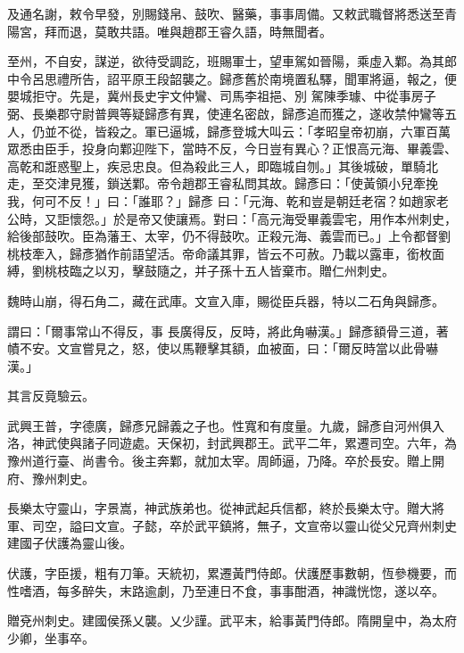 \begin{pinyinscope}
 及通名謝，敕令早發，別賜錢帛、鼓吹、醫藥，事事周備。又敕武職督將悉送至青陽宮，拜而退，莫敢共語。唯與趙郡王睿久語，時無聞者。



 至州，不自安，謀逆，欲待受調訖，班賜軍士，望車駕如晉陽，乘虛入鄴。為其郎中令呂思禮所告，詔平原王段韶襲之。歸彥舊於南境置私驛，聞軍將逼，報之，便嬰城拒守。先是，冀州長史宇文仲鸞、司馬李祖挹、別
 駕陳季璩、中從事房子弼、長樂郡守尉普興等疑歸彥有異，使連名密啟，歸彥追而獲之，遂收禁仲鸞等五人，仍並不從，皆殺之。軍已逼城，歸彥登城大叫云：「孝昭皇帝初崩，六軍百萬眾悉由臣手，投身向鄴迎陛下，當時不反，今日豈有異心？正恨高元海、畢義雲、高乾和誑惑聖上，疾忌忠良。但為殺此三人，即臨城自刎。」其後城破，單騎北走，至交津見獲，鎖送鄴。帝令趙郡王睿私問其故。歸彥曰：「使黃領小兒牽挽我，何可不反！」曰：「誰耶？」歸彥
 曰：「元海、乾和豈是朝廷老宿？如趙家老公時，又詎懷怨。」於是帝又使讓焉。對曰：「高元海受畢義雲宅，用作本州刺史，給後部鼓吹。臣為藩王、太宰，仍不得鼓吹。正殺元海、義雲而已。」上令都督劉桃枝牽入，歸彥猶作前語望活。帝命議其罪，皆云不可赦。乃載以露車，銜枚面縛，劉桃枝臨之以刃，擊鼓隨之，并子孫十五人皆棄市。贈仁州刺史。



 魏時山崩，得石角二，藏在武庫。文宣入庫，賜從臣兵器，特以二石角與歸彥。



 謂曰：「爾事常山不得反，事
 長廣得反，反時，將此角嚇漢。」歸彥額骨三道，著幘不安。文宣嘗見之，怒，使以馬鞭擊其額，血被面，曰：「爾反時當以此骨嚇漢。」



 其言反竟驗云。



 武興王普，字德廣，歸彥兄歸義之子也。性寬和有度量。九歲，歸彥自河州俱入洛，神武使與諸子同遊處。天保初，封武興郡王。武平二年，累遷司空。六年，為豫州道行臺、尚書令。後主奔鄴，就加太宰。周師逼，乃降。卒於長安。贈上開府、豫州刺史。



 長樂太守靈山，字景嵩，神武族弟也。從神武起兵信都，終於長樂太守。贈大將軍、司空，謚曰文宣。子懿，卒於武平鎮將，無子，文宣帝以靈山從父兄齊州刺史建國子伏護為靈山後。



 伏護，字臣援，粗有刀筆。天統初，累遷黃門侍郎。伏護歷事數朝，恆參機要，而性嗜酒，每多醉失，末路逾劇，乃至連日不食，事事酣酒，神識恍惚，遂以卒。



 贈兗州刺史。建國侯孫乂襲。乂少謹。武平末，給事黃門侍郎。隋開皇中，為太府少卿，坐事卒。



\end{pinyinscope}